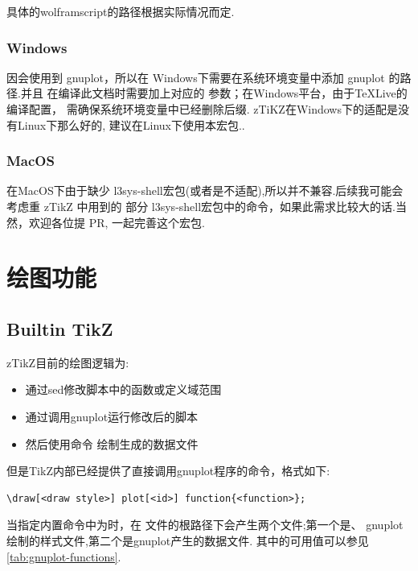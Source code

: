 具体的wolframscript的路径根据实际情况而定.

\subsubsection{Windows}
因会使用到 {gnuplot}，所以在 Windows下需要在系统环境变量中添加 {gnuplot} 的路径.并且
在编译此文档时需要加上对应的 参数；在Windows平台，由于\TeX{}Live的编译配置，
需确保系统环境变量中已经删除后缀. zTiKZ在Windows下的适配是没有Linux下那么好的,
建议在Linux下使用本宏包..

\subsubsection{MacOS}
在MacOS下由于缺少 {l3sys-shell}宏包(或者是不适配),所以并不兼容.后续我可能会考虑重 zTikZ 中用到的
部分 {l3sys-shell}宏包中的命令，如果此需求比较大的话.当然，欢迎各位提 PR, 一起完善这个宏包.

\section{绘图功能}
\subsection{Builtin TikZ}
zTikZ目前的绘图逻辑为:
\begin{itemize}
    \item 通过sed修改脚本中的函数或定义域范围
    \item 通过调用gnuplot运行修改后的脚本
    \item 然后使用命令 绘制生成的数据文件
\end{itemize}

但是TikZ内部已经提供了直接调用gnuplot程序的命令，格式如下:
\begin{verbatim}
\draw[<draw style>] plot[<id>] function{<function>};
\end{verbatim}

当指定内置命令中为时，在 文件的根路径下会产生两个文件;第一个是、
gnuplot绘制的样式文件,第二个是gnuplot产生的数据文件.
其中的可用值可以参见\cref{tab:gnuplot-functions}. 

